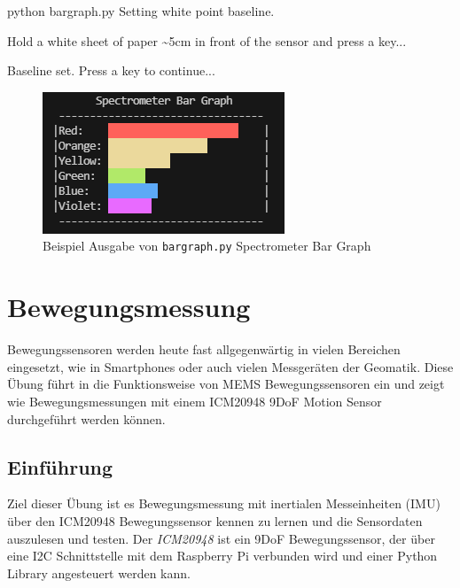 \documentclass[
  11pt,
  a4paperpaper,
  oneside, openany  ,captions=tableheading
]{scrbook}
\newenvironment{Shaded}{\begin{snugshade}}{\end{snugshade}}
\newcommand{\ExtensionTok}[1]{\textcolor[rgb]{0.00,0.23,0.31}{#1}}
\newcommand{\NormalTok}[1]{\textcolor[rgb]{0.00,0.23,0.31}{#1}}
\theoremstyle{definition}
\theoremstyle{remark}
\begin{document}
\begin{Shaded}
\begin{Highlighting}[]
\ExtensionTok{python}\NormalTok{ bargraph.py }
\ExtensionTok{Setting}\NormalTok{ white point baseline.}

\ExtensionTok{Hold}\NormalTok{ a white sheet of paper \textasciitilde{}5cm in front of the sensor and press a key...}

\ExtensionTok{Baseline}\NormalTok{ set. Press a key to continue...   }
\end{Highlighting}
\end{Shaded}

\begin{figure}[H]

{\centering \includegraphics{images/as7262_bargraph.png}

}

\caption{Beispiel Ausgabe von \texttt{bargraph.py} Spectrometer Bar
Graph}

\end{figure}%

\chapter{Bewegungsmessung}\label{bewegungsmessung}

Bewegungssensoren werden heute fast allgegenwärtig in vielen Bereichen
eingesetzt, wie in Smartphones oder auch vielen Messgeräten der
Geomatik. Diese Übung führt in die Funktionsweise von MEMS
Bewegungssensoren ein und zeigt wie Bewegungsmessungen mit einem
ICM20948 9DoF Motion Sensor durchgeführt werden können.

\hfill\break

\section{Einführung}\label{einfuxfchrung-2}

Ziel dieser Übung ist es Bewegungsmessung mit inertialen Messeinheiten
(IMU) über den ICM20948 Bewegungssensor kennen zu lernen und
die Sensordaten auszulesen und testen. Der \emph{ICM20948} ist ein 9DoF
Bewegungssensor, der über eine I2C Schnittstelle mit dem Raspberry Pi
verbunden wird und einer Python Library angesteuert werden kann.
\end{document}

